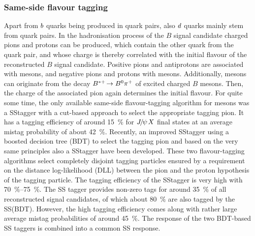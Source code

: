 
\subsubsection{Same-side flavour tagging}
\label{sec:detecor:software:tagging:sstagger}

Apart from ${b}$ quarks being produced in \bbbar quark pairs, also
${d}$ quarks mainly stem from \ddbar quark pairs. In the hadronisation
process of the $B$ signal candidate charged pions and protons can be produced,
which contain the other quark from the \ddbar quark pair, and whose charge is
thereby correlated with the initial flavour of the reconstructed $B$ signal
candidate. Positive pions and antiprotons are associated with \Bz mesons, and
negative pions and protons with \Bzb mesons. Additionally, \Bd mesons can
originate from the decay $B^{*+}\!\rightarrow{\ensuremath{{B}^0}}{\ensuremath{{\pi}^+}}$ of excited charged $B$ mesons.
Then, the charge of the associated pion again determines the initial flavour.
For quite some time, the only available same-side flavour-tagging algorithm for
\Bz mesons was a SS\pion tagger with a cut-based approach to select the
appropriate tagging pion. It has a tagging efficiency of around
\SI{15}{\percent} for ${{J\mskip -3mu/\mskip -2mu\psi\mskip 2mu}}X$ final states at an average mistag probability
of about \SI{42}{\percent}. Recently, an improved SS\pion tagger using a
boosted decision tree (BDT) to select the tagging pion and based on the very
same principles also a SS\proton tagger have been
developed\cite{CERN-THESIS-2015-040,LHCb-PAPER-2016-039}. These two
flavour-tagging algorithms select completely disjoint tagging particles
ensured by a requirement on the distance log-likelihood (DLL) between the pion
and the proton hypothesis of the tagging particle. The tagging efficiency of
the SS\pion tagger is very high with \SIrange{70}{75}{\percent}. The SS\proton
tagger provides non-zero tags for around \SI{35}{\percent} of all
reconstructed signal candidates, of which about \SI{80}{\percent} are also
tagged by the SS\pion (BDT). However, the high tagging efficiency comes along
with rather large average mistag probabilities of around \SI{45}{\percent}.
The response of the two BDT-based SS taggers is combined into a common SS
response.